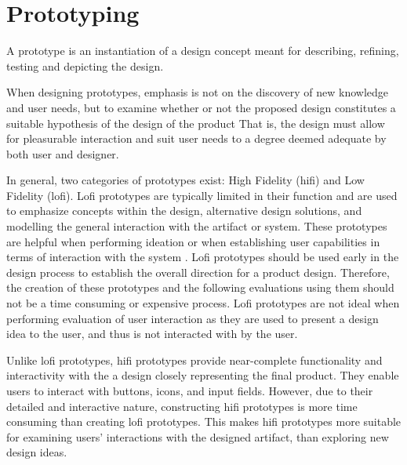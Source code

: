 \section{Prototyping} %
A prototype is an instantiation of a design concept meant for describing, refining, testing and depicting the design.\cite{BUXTON2007139_prototyping}

When designing prototypes, emphasis is not on the discovery of new knowledge and user needs, but to examine whether or not the proposed design constitutes a suitable hypothesis of the design of the product\cite{nielsen-norman-prototype-low-vs-high,BUXTON2007139_prototyping}
That is, the design must allow for pleasurable interaction and suit user needs to a degree deemed adequate by both user and designer.

In general, two categories of prototypes exist: High Fidelity (hifi) and Low Fidelity (lofi).
Lofi prototypes are typically limited in their function and are used to emphasize concepts within the design, alternative design solutions, and modelling the general interaction with the artifact or system\cite{low-vs-high-fidelity-prototype}.
These prototypes are helpful when performing ideation\cite{nielsen-norman-ideation} or when establishing user capabilities in terms of interaction with the system \cite{usefullness-of-different-prototypes,low-vs-high-fidelity-prototype}.
Lofi prototypes should be used early in the design process to establish the overall direction for a product design. 
Therefore, the creation of these prototypes and the following evaluations using them should not be a time consuming or expensive process. \cite{usefullness-of-different-prototypes,low-vs-high-fidelity-prototype}  
Lofi prototypes are not ideal when performing evaluation of user interaction as they are used to present a design idea to the user, and thus is not interacted with by the user\cite{low-vs-high-fidelity-prototype}.

Unlike lofi prototypes, hifi prototypes provide near-complete functionality and interactivity with the a design closely representing the final product.
They enable users to interact with buttons, icons, and input fields.
However, due to their detailed and interactive nature, constructing hifi prototypes is more time consuming than creating lofi prototypes. 
This makes hifi prototypes more suitable for examining users' interactions with the designed artifact, than exploring new design ideas. \cite{nielsen-norman-prototype-low-vs-high,low-vs-high-fidelity-prototype}



